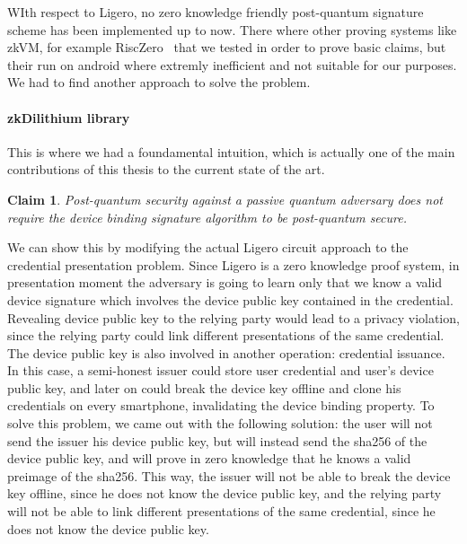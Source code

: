 \documentclass{article}
\newtheorem{claim}{Claim}
\begin{document}
WIth respect to Ligero, no zero knowledge friendly post-quantum signature scheme has been implemented up to now.
There where other proving systems like zkVM, for example RiscZero~\cite{RiscZero2026} that we tested in order to prove basic claims, but their
run on android where extremly inefficient and not suitable for our purposes. We had to find another approach to solve the problem.

\paragraph{zkDilithium library}
This is where we had a foundamental intuition, which is actually one of the main contributions of this thesis to the current
state of the art. 
\begin{claim}
Post-quantum security against a passive quantum adversary does not require the device binding signature algorithm to be post-quantum secure.
\end{claim}
We can show this by modifying the actual Ligero circuit approach to the credential presentation problem.
Since Ligero is a zero knowledge proof system, in presentation moment the adversary is going to learn only that we know a valid
device signature which involves the device public key contained in the credential. Revealing device public key to the relying party
would lead to a privacy violation, since the relying party could link different presentations of the same credential.
The device public key is also involved in another operation: credential issuance. 
In this case, a semi-honest issuer could store user credential and user's device public key, and later on could break the device key
offline and clone his credentials on every smartphone, invalidating the device binding property.
To solve this problem, we came out with the following solution: the user will not send the issuer his device public key, 
but will instead send the sha256 of the device public key, and will prove in zero knowledge that he knows a valid preimage of the 
sha256. This way, the issuer will not be able to break the device key offline, since he does not know the device public key,
and the relying party will not be able to link different presentations of the same credential, since he does not know the device public key.
\end{document}
